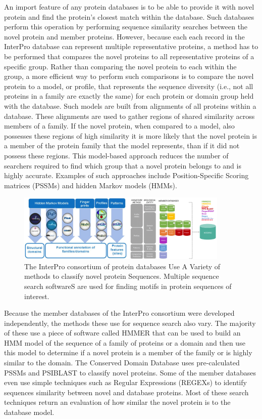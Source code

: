 An import feature of any protein databases is to be able to provide it with novel protein and find the protein's closest match within the database. Such databases perform this operation by performing sequence similarity searches between the novel protein and member proteins. However, because each each record in the InterPro database can represent multiple representative proteins, a method has to be performed that compares the novel proteins to all representative proteins of a specific group. Rather than comparing the novel protein to each within the group, a more efficient way to perform such comparisons is to compare the novel protein to a model, or profile, that represents the sequence diversity (i.e., not all proteins in a family are exactly the same) for each protein or domain group held with the database. Such models are built from alignments of all proteins within a database. These alignments are used to gather regions of shared similarity across members of a family. If the novel protein, when compared to a model, also possesses these regions of high similarity it is more likely that the novel protein is a member of the protein family that the model represents, than if it did not possess these regions. This model-based approach reduces the number of searchers required to find which group that a novel protein belongs to and is highly accurate. Examples of such approaches include Position-Specific Scoring matrices (PSSMs) and hidden Markov models (HMMs).

\begin{figure}[!ht]
  \centering
	\includegraphics[width=0.90\textwidth]{media/InterPro.png}
	 \caption{The InterPro consortium of protein databases Use A Variety of methods to classify novel protein Sequences. Multiple sequence search softwareS are used for finding motifs in protein sequences of interest.}
	 \label{fig:interpro-databases}
\end{figure}

Because the member databases of the InterPro consortium were developed independently, the methods these use for sequence search also vary. The majority of these use a piece of software called HMMER that can be used to build an HMM model of the sequence of a family of proteins or a domain and then use this model to determine if a novel protein is a member of the family or is highly similar to the domain. The Conserved Domain Database uses pre-calculated PSSMs and PSIBLAST to classify novel proteins. Some of the member databases even use simple techniques such as Regular Expressions (REGEXs) to identify sequences similarity between novel and database proteins. Most of these search techniques return an evaluation of how similar the novel protein is to the database model.

